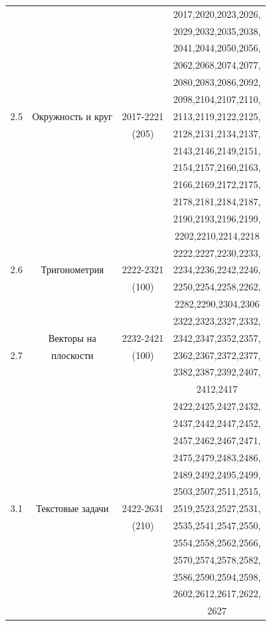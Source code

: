 \begin{table}[H]
\begin{center}
\begin{tabular}{|c|c|c|c|}
\hline
~ & ~ & ~ & 2017,2020,2023,2026,\\
~ & ~ & ~ & 2029,2032,2035,2038,\\
~ & ~ & ~ & 2041,2044,2050,2056,\\
~ & ~ & ~ & 2062,2068,2074,2077,\\
~ & ~ & ~ & 2080,2083,2086,2092,\\
~ & ~ & ~ & 2098,2104,2107,2110,\\
2.5 & Окружность и круг & 2017-2221 & 2113,2119,2122,2125,\\
~ & ~ & (205) & 2128,2131,2134,2137,\\
~ & ~ & ~ & 2143,2146,2149,2151,\\
~ & ~ & ~ & 2154,2157,2160,2163,\\
~ & ~ & ~ & 2166,2169,2172,2175,\\
~ & ~ & ~ & 2178,2181,2184,2187,\\
~ & ~ & ~ & 2190,2193,2196,2199,\\
~ & ~ & ~ & 2202,2210,2214,2218\\
\hline
~ & ~ & ~ & 2222,2227,2230,2233,\\
2.6 & Тригонометрия & 2222-2321 & 2234,2236,2242,2246,\\
~ & ~ & (100) & 2250,2254,2258,2262,\\
~ & ~ & ~ & 2282,2290,2304,2306\\
\hline
~ & ~ & ~ & 2322,2323,2327,2332,\\
~ & Векторы на & 2232-2421 & 2342,2347,2352,2357,\\
2.7 & плоскости & (100) & 2362,2367,2372,2377,\\
~ & ~ & ~ & 2382,2387,2392,2407,\\
~ & ~ & ~ & 2412,2417\\
\hline
~ & ~ & ~ & 2422,2425,2427,2432,\\
~ & ~ & ~ & 2437,2442,2447,2452,\\
~ & ~ & ~ & 2457,2462,2467,2471,\\
~ & ~ & ~ & 2475,2479,2483,2486,\\
~ & ~ & ~ & 2489,2492,2495,2499,\\
~ & ~ & ~ & 2503,2507,2511,2515,\\
3.1 & Текстовые задачи & 2422-2631 & 2519,2523,2527,2531,\\
~ & ~ & (210) & 2535,2541,2547,2550,\\
~ & ~ & ~ & 2554,2558,2562,2566,\\
~ & ~ & ~ & 2570,2574,2578,2582,\\
~ & ~ & ~ & 2586,2590,2594,2598,\\
~ & ~ & ~ & 2602,2612,2617,2622,\\
~ & ~ & ~ & 2627\\
\hline
\end{tabular}
\end{center}
\end{table}
